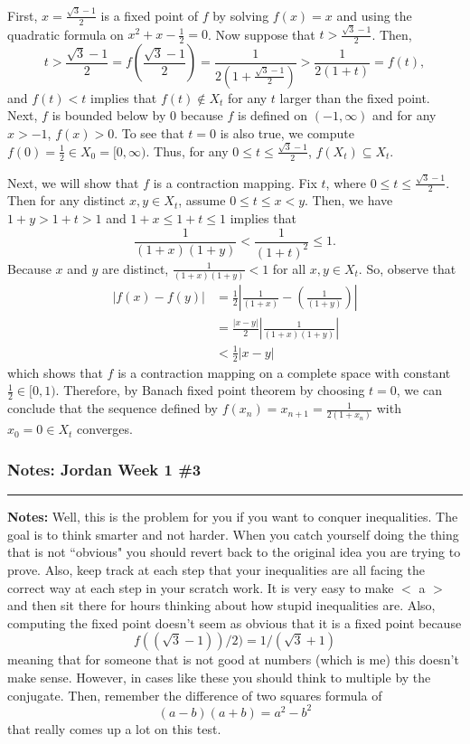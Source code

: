 \documentclass{article}
\begin{document}
First, $x = \frac{\sqrt{3}-1}{2}$ is a fixed point of $f$ by solving $f(x) = x$ and using the quadratic formula on $x^2 + x -\frac{1}{2} = 0$. Now suppose that $t >  \frac{\sqrt{3}-1}{2}$. Then, 
	\[ t >  \frac{\sqrt{3}-1}{2} = f( \frac{\sqrt{3}-1}{2}) = \frac{1}{2(1+ \frac{\sqrt{3}-1}{2})} > \frac{1}{2(1+t)} = f(t),\]
and $f(t) < t$ implies that $f(t) \not\in X_t$ for any $t$ larger than the fixed point. Next, $f$ is bounded below by 0 because $f$ is defined on $(-1,\infty)$ and for any $x>-1$, $f(x) > 0$. To see that $t = 0$ is also true, we compute $f(0) = \frac{1}{2} \in X_0 = [0,\infty)$. Thus, for any $0 \leq t \leq \frac{\sqrt{3} - 1}{2}$, $f(X_t) \subseteq X_t$. 

Next, we will show that $f$ is a contraction mapping. Fix $t$, where $0\leq t\leq \frac{\sqrt{3} - 1}{2}$. Then for any distinct $x,y\in X_t$, assume $0\leq t \leq  x < y$. Then, we have $1+y > 1+t  > 1$ and $1+x \leq 1+ t \leq 1$ implies that 
	\[ \frac{1}{(1+x)(1+y)}< \frac{1}{(1+t)^2} \leq 1.\]
Because $x$ and $y$ are distinct, $\frac{1}{(1+x)(1+y)}<1$ for all $x,y\in X_t$. So, observe that
	\begin{align}
		|f(x) - f(y)| & = \frac{1}{2}\left| \frac{1}{(1+x)} - \left(\frac{1}{(1+y)}\right)\right| \\
				& = \frac{|x-y|}{2} \left| \frac{1}{(1+x)(1+y)}\right|\\
				& < \frac{1}{2}|x-y|
	\end{align}
which shows that $f$ is a contraction mapping on a complete space with constant $\frac{1}{2}\in[0,1)$. Therefore, by Banach fixed point theorem by choosing $t = 0$, we can conclude that the sequence defined by $f(x_n) = x_{n+1} = \frac{1}{2(1+x_n)}$ with $x_0 = 0 \in X_t$ converges.\\

\break

\subsubsection*{Notes: Jordan Week 1 \#3}

\hrule 

\textbf{Notes:} Well, this is the problem for you if you want to conquer inequalities. The goal is to think smarter and not harder. When you catch yourself doing the thing that is not ``obvious" you should revert back to the original idea you are trying to prove. Also, keep track at each step that your inequalities are all facing the correct way at each step in your scratch work. It is very easy to make $<$ a $>$ and then sit there for hours thinking about how stupid inequalities are. Also, computing the fixed point doesn't seem as obvious that it is a fixed point because 
	\[f((\sqrt{3}-1))/2) = 1/(\sqrt{3} + 1)\]
meaning that for someone that is not good at numbers (which is me) this doesn't make sense. However, in cases like these you should think to multiple by the conjugate. Then, remember the difference of two squares formula of 
	\[(a-b)(a+b) = a^2 - b^2\]
that really comes up a lot on this test.
\end{document}
